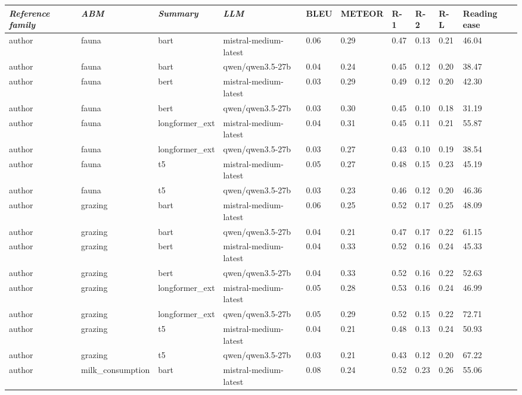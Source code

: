 \begin{tabular}{|l|l|l|l|l|l|l|l|l|l|}
\hline
\textit{\textbf{Reference family}} & \textit{\textbf{ABM}} & \textit{\textbf{Summary}} & \textit{\textbf{LLM}} & BLEU & METEOR & R-1 & R-2 & R-L & Reading ease \\
 \hline
 author & fauna & bart & mistral-medium-latest & 0.06 & 0.29 & 0.47 & 0.13 & 0.21 & 46.04 \\
 \hline
 author & fauna & bart & qwen/qwen3.5-27b & 0.04 & 0.24 & 0.45 & 0.12 & 0.20 & 38.47 \\
 \hline
 author & fauna & bert & mistral-medium-latest & 0.03 & 0.29 & 0.49 & 0.12 & 0.20 & 42.30 \\
 \hline
 author & fauna & bert & qwen/qwen3.5-27b & 0.03 & 0.30 & 0.45 & 0.10 & 0.18 & 31.19 \\
 \hline
 author & fauna & longformer\_ext & mistral-medium-latest & 0.04 & 0.31 & 0.45 & 0.11 & 0.21 & 55.87 \\
 \hline
 author & fauna & longformer\_ext & qwen/qwen3.5-27b & 0.03 & 0.27 & 0.43 & 0.10 & 0.19 & 38.54 \\
 \hline
 author & fauna & t5 & mistral-medium-latest & 0.05 & 0.27 & 0.48 & 0.15 & 0.23 & 45.19 \\
 \hline
 author & fauna & t5 & qwen/qwen3.5-27b & 0.03 & 0.23 & 0.46 & 0.12 & 0.20 & 46.36 \\
 \hline
 author & grazing & bart & mistral-medium-latest & 0.06 & 0.25 & 0.52 & 0.17 & 0.25 & 48.09 \\
 \hline
 author & grazing & bart & qwen/qwen3.5-27b & 0.04 & 0.21 & 0.47 & 0.17 & 0.22 & 61.15 \\
 \hline
 author & grazing & bert & mistral-medium-latest & 0.04 & 0.33 & 0.52 & 0.16 & 0.24 & 45.33 \\
 \hline
 author & grazing & bert & qwen/qwen3.5-27b & 0.04 & 0.33 & 0.52 & 0.16 & 0.22 & 52.63 \\
 \hline
 author & grazing & longformer\_ext & mistral-medium-latest & 0.05 & 0.28 & 0.53 & 0.16 & 0.24 & 46.99 \\
 \hline
 author & grazing & longformer\_ext & qwen/qwen3.5-27b & 0.05 & 0.29 & 0.52 & 0.15 & 0.22 & 72.71 \\
 \hline
 author & grazing & t5 & mistral-medium-latest & 0.04 & 0.21 & 0.48 & 0.13 & 0.24 & 50.93 \\
 \hline
 author & grazing & t5 & qwen/qwen3.5-27b & 0.03 & 0.21 & 0.43 & 0.12 & 0.20 & 67.22 \\
 \hline
 author & milk\_consumption & bart & mistral-medium-latest & 0.08 & 0.24 & 0.52 & 0.23 & 0.26 & 55.06 \\

\end{tabular}
